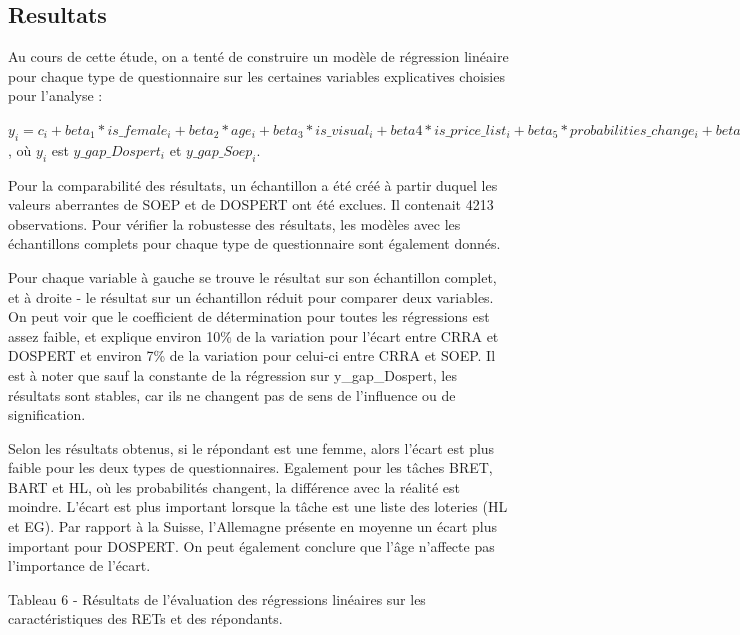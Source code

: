 \documentclass[12pt]{article}
\begin{document}
\subsection{Resultats}

Au cours de cette étude, on a tenté de construire un modèle de
régression linéaire pour chaque type de questionnaire sur les certaines
variables explicatives choisies pour l'analyse :

\(y_i = c_i + beta_1 * is\_female_i+ beta_2 * age_i + beta_3 * is\_visual_i + beta4 * is\_price\_list_i + beta_5 * probabilities\_change_i + beta_6 * stakes_i + beta_7 * germany_i + epsilon_i\)
, où \(y_i\) est \(y\_gap\_Dospert_i\) et \(y\_gap\_Soep_i\).

Pour la comparabilité des résultats, un échantillon a été créé à partir
duquel les valeurs aberrantes de SOEP et de DOSPERT ont été exclues. Il
contenait 4213 observations. Pour vérifier la robustesse des résultats,
les modèles avec les échantillons complets pour chaque type de
questionnaire sont également donnés.

Pour chaque variable à gauche se trouve le résultat sur son échantillon
complet, et à droite - le résultat sur un échantillon réduit pour
comparer deux variables. On peut voir que le coefficient de
détermination pour toutes les régressions est assez faible, et explique
environ 10\% de la variation pour l'écart entre CRRA et DOSPERT et
environ 7\% de la variation pour celui-ci entre CRRA et SOEP. Il est à
noter que sauf la constante de la régression sur y\_gap\_Dospert, les
résultats sont stables, car ils ne changent pas de sens de l'influence
ou de signification.

Selon les résultats obtenus, si le répondant est une femme, alors
l'écart est plus faible pour les deux types de questionnaires. Egalement
pour les tâches BRET, BART et HL, où les probabilités changent, la
différence avec la réalité est moindre. L'écart est plus important
lorsque la tâche est une liste des loteries (HL et EG). Par rapport à la
Suisse, l'Allemagne présente en moyenne un écart plus important pour
DOSPERT. On peut également conclure que l'âge n'affecte pas l'importance
de l'écart.

Tableau 6 - Résultats de l'évaluation des régressions linéaires sur les
caractéristiques des RETs et des répondants.
\end{document}
